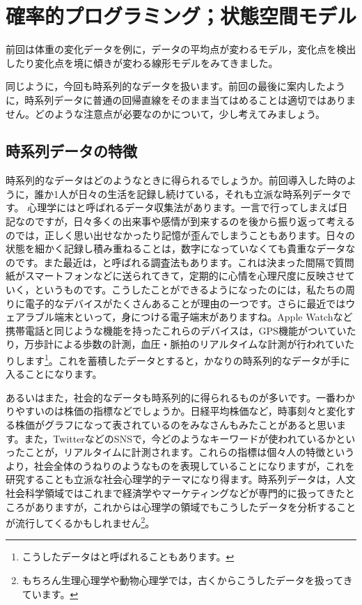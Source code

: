 \documentclass{ltjsbook}
\begin{document}
 
\chapter{確率的プログラミング；状態空間モデル}
\label{chapter29} 
前回は体重の変化データを例に，データの平均点が変わるモデル，変化点を検出したり変化点を境に傾きが変わる線形モデルをみてきました。

同じように，今回も時系列的なデータを扱います。前回の最後に案内したように，時系列データに普通の回帰直線をそのまま当てはめることは適切ではありません。どのような注意点が必要なのかについて，少し考えてみましょう。

\section{時系列データの特徴}
時系列的なデータはどのようなときに得られるでしょうか。前回導入した時のように，誰か1人が日々の生活を記録し続けている，それも立派な時系列データです。
心理学にはと呼ばれるデータ収集法があります。一言で行ってしまえば日記なのですが，日々多くの出来事や感情が到来するのを後から振り返って考えるのでは，正しく思い出せなかったり記憶が歪んでしまうこともあります。日々の状態を細かく記録し積み重ねることは，数字になっていなくても貴重なデータなのです。また最近は，と呼ばれる調査法もあります。これは決まった間隔で質問紙がスマートフォンなどに送られてきて，定期的に心情を心理尺度に反映させていく，というものです。こうしたことができるようになったのには，私たちの周りに電子的なデバイスがたくさんあることが理由の一つです。さらに最近ではウェアラブル端末といって，身につける電子端末がありますね。Apple Watchなど携帯電話と同じような機能を持ったこれらのデバイスは，GPS機能がついていたり，万歩計による歩数の計測，血圧・脈拍のリアルタイムな計測が行われていたりします\footnote{こうしたデータはと呼ばれることもあります。}。これを蓄積したデータとすると，かなりの時系列的なデータが手に入ることになります。

あるいはまた，社会的なデータも時系列的に得られるものが多いです。一番わかりやすいのは株価の指標などでしょうか。日経平均株価など，時事刻々と変化する株価がグラフになって表されているのをみなさんもみたことがあると思います。また，TwitterなどのSNSで，今どのようなキーワードが使われているかといったことが，リアルタイムに計測されます。これらの指標は個々人の特徴というより，社会全体のうねりのようなものを表現していることになりますが，これを研究することも立派な社会心理学的テーマになり得ます。時系列データは，人文社会科学領域ではこれまで経済学やマーケティングなどが専門的に扱ってきたところがありますが，これからは心理学の領域でもこうしたデータを分析することが流行してくるかもしれません\footnote{もちろん生理心理学や動物心理学では，古くからこうしたデータを扱ってきています。}。
\end{document}
